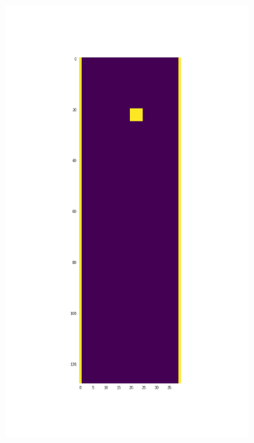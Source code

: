 \documentclass[]{article}
\begin{document}
\begin{figure}
	\centering
	\begin{subfigure}[b]{.49\textwidth}
		\centering
		\includegraphics[width=\linewidth]{figures/box_boundary.png}
		\caption{}
		\label{fig:box_boundary} 
	\end{subfigure}
{\tiny {\tiny }}	\begin{subfigure}[b]{0.49\textwidth}
		\centering

\end{subfigure}
\end{figure}
\end{document}
